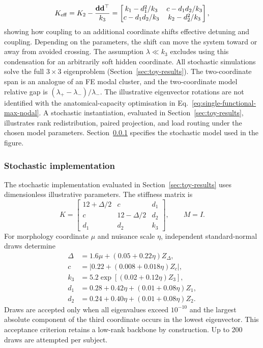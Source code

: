 \documentclass[pdflatex,sn-basic]{sn-jnl}
\begin{document}
\begin{equation}
K_{\rm eff} = K_2 - \frac{\mathbf d \mathbf d^\top}{k_3} = \begin{bmatrix} k_1-d_1^2/k_3 & c-d_1d_2/k_3\\ c-d_1d_2/k_3 & k_2-d_2^2/k_3\end{bmatrix},
\label{eq:schur}
\end{equation}
showing how coupling to an additional coordinate shifts effective detuning and coupling. Depending on the parameters, the shift can move the system toward or away from avoided crossing. The assumption $\lambda\ll k_3$ excludes using this condensation for an arbitrarily soft hidden coordinate.
All stochastic simulations solve the full $3\times 3$ eigenproblem (Section~\ref{sec:toy-results}).
The two-coordinate span is an analogue of an FE modal cluster, and the two-coordinate model relative gap is $(\lambda_+-\lambda_-)/\lambda_-$. The illustrative eigenvector rotations are not identified with the anatomical-capacity optimisation in Eq.~\eqref{eq:single-functional-max-nodal}.
A stochastic instantiation, evaluated in Section~\ref{sec:toy-results}, illustrates rank redistribution, paired projection, and load routing under the chosen model parameters.
Section~\ref{sec:toy-specification} specifies the stochastic model used in the figure.

\subsubsection{Stochastic implementation}\label{sec:toy-specification}
The stochastic implementation evaluated in Section~\ref{sec:toy-results} uses dimensionless illustrative parameters. The stiffness matrix is
\begin{equation}
K=\begin{bmatrix}12+\Delta/2&c&d_1\\c&12-\Delta/2&d_2\\d_1&d_2&k_3\end{bmatrix},\qquad M=I.
\end{equation}
For morphology coordinate $\mu$ and nuisance scale $\eta$, independent standard-normal draws determine
\begin{align}
\Delta&=1.6\mu+(0.05+0.22\eta)Z_\Delta,\\
c&=|0.22+(0.008+0.018\eta)Z_c|,\\
k_3&=5.2\exp[(0.02+0.12\eta)Z_3],\\
d_1&=0.28+0.42\eta+(0.01+0.08\eta)Z_1,\\
d_2&=0.24+0.40\eta+(0.01+0.08\eta)Z_2.
\end{align}
Draws are accepted only when all eigenvalues exceed $10^{-10}$ and the largest absolute component of the third coordinate occurs in the lowest eigenvector. This acceptance criterion retains a low-rank backbone by construction. Up to 200 draws are attempted per subject.
\end{document}
